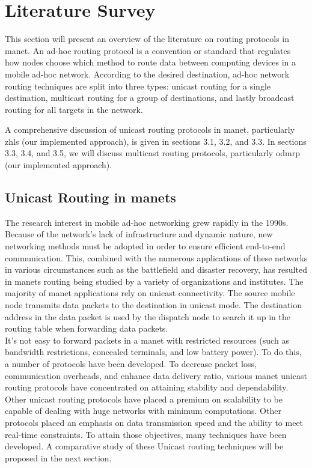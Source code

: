 \chapter{Literature Survey}
\label{ch:literature-survey}

\quad This section will present an overview of the literature on routing protocols in \acrshort{manet}. An ad-hoc routing protocol is a convention or standard that regulates how nodes choose which method to route data between computing devices in a mobile ad-hoc network. According to the desired destination, ad-hoc network routing techniques are split into three types: unicast routing for a single destination, multicast routing for a group of destinations, and lastly broadcast routing for all targets in the network.

A comprehensive discussion of unicast routing protocols in \acrshort{manet}, particularly \acrshort{zhls} (our implemented approach), is given in sections 3.1, 3.2, and 3.3. In sections 3.3, 3.4, and 3.5, we will discuss multicast routing protocols, particularly \acrshort{odmrp} (our implemented approach).

\section{Unicast Routing in \acrshort{manets}}
\qquad The research interest in mobile ad-hoc networking grew rapidly in the 1990s. Because of the network's lack of infrastructure and dynamic nature, new networking methods must be adopted in order to ensure efficient end-to-end communication. This, combined with the numerous applications of these networks in various circumstances such as the battlefield and disaster recovery, has resulted in \acrshort{manets} routing being studied by a variety of organizations and institutes. The majority of \acrshort{manet} applications rely on unicast connectivity. The source mobile node transmits data packets to the destination in unicast mode. The destination address in the data packet is used by the dispatch node to search it up in the routing table when forwarding data packets\cite{unicast1}. \\

It's not easy to forward packets in a \acrshort{manet} with restricted resources (such as bandwidth restrictions, concealed terminals, and low battery power). To do this, a number of protocols have been developed. To decrease packet loss, communication overheads, and enhance data delivery ratio, various \acrshort{manet} unicast routing protocols have concentrated on attaining stability and dependability. Other unicast routing protocols have placed a premium on scalability to be capable of dealing with huge networks with minimum  computations. Other protocols placed an emphasis on data transmission speed and the ability to meet real-time constraints. To attain those objectives, many techniques have been developed. A comparative study of these Unicast routing techniques will be proposed in the next section.

